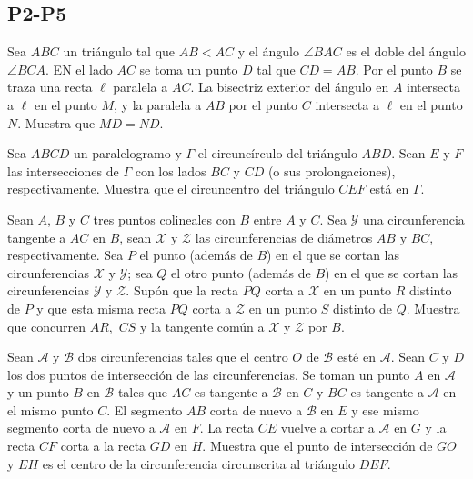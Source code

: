 \documentclass[11pt]{scrartcl}
\begin{document}
\subsection{P2-P5}
\begin{problem} [2001/5] 
    Sea $ABC$ un triángulo tal que $AB< AC$ y el ángulo $\angle BAC$ es el doble del ángulo $\angle BCA$. EN el lado $AC$ se toma un punto $D$ tal que $CD=AB$. Por el punto $B$ se traza una recta $\ell$ paralela a $AC$. La bisectriz exterior del ángulo en $A$ intersecta a $\ell$ en el punto $M$, y la paralela a $AB$ por el punto $C$ intersecta a $\ell$ en el punto $N$. Muestra que $MD=ND$.
    \end{problem}
\begin{problem} [2002/2]
    Sea $ABCD$ un paralelogramo y $\Gamma$ el circuncírculo del triángulo $ABD$. Sean $E$ y $F$ las intersecciones de $\Gamma$ con los lados $BC$ y $CD$ (o sus prolongaciones), respectivamente. Muestra que el circuncentro del triángulo $CEF$ está en $\Gamma$.
  \end{problem}
\begin{problem} [2003/2] 
    Sean $A$, $B$ y $C$ tres puntos colineales con $B$ entre $A$ y $C$. Sea $\mathcal{Y}$ una circunferencia tangente a $AC$ en $B$, sean $\mathcal{X}$ y $\mathcal{Z}$ las circunferencias de diámetros $AB$ y $BC$, respectivamente. Sea $P$ el punto (además de $B$) en el que se cortan las circunferencias $\mathcal{X}$ y $\mathcal{Y}$; sea $Q$ el otro punto (además de $B$) en el que se cortan las circunferencias $\mathcal{Y}$ y $\mathcal{Z}$. Supón que la recta $PQ$ corta a $\mathcal{X}$ en un punto $R$ distinto de $P$ y que esta misma recta $PQ$ corta a $\mathcal{Z}$ en un punto $S$ distinto de $Q$. Muestra que concurren $AR,$ $CS$ y la tangente común a $\mathcal{X}$ y $\mathcal{Z}$ por $B$.
    \end{problem}
\begin{problem} [2004/5] 
    Sean $\mathcal{A}$ y $\mathcal{B}$ dos circunferencias tales que el centro $O$ de $\mathcal{B}$ esté en $\mathcal{A}$. Sean $C$ y $D$ los dos puntos de intersección de las circunferencias. Se toman un punto $A$ en $\mathcal{A}$ y un punto $B$ en $\mathcal{B}$ tales que $AC$ es tangente a $\mathcal{B}$ en $C$ y $BC$ es tangente a $\mathcal{A}$ en el mismo punto $C$. El segmento $AB$ corta de nuevo a $\mathcal{B}$ en $E$ y ese mismo segmento corta de nuevo a $\mathcal{A}$ en $F$. La recta $CE$ vuelve a cortar a $\mathcal{A}$ en $G$ y la recta $CF$ corta a la recta $GD$ en $H$. Muestra que el punto de intersección de $GO$ y $EH$ es el centro de la circunferencia circunscrita al triángulo $DEF$.
   \end{problem}
\end{document}
